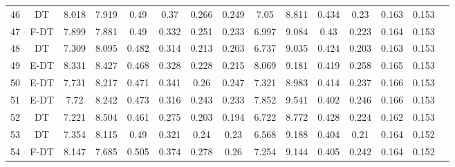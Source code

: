 \begin{longtable}{@{\hskip3pt}c@{\hskip3pt}c@{\hskip3pt}c@{\hskip3pt}c@{\hskip3pt}c@{\hskip3pt}c@{\hskip3pt}c@{\hskip3pt}c@{\hskip3pt}c@{\hskip3pt}c@{\hskip3pt}c@{\hskip3pt}c@{\hskip3pt}c@{\hskip3pt}c@{\hskip3pt}c}
         46 &             DT &             8.018 &          7.919 &            0.49 &            0.37 &           0.266 &           0.249 &                7.05 &           8.811 &           0.434 &          0.23 &          0.163 &           0.153 \\
         47 &           F-DT &             7.899 &          7.881 &            0.49 &           0.332 &           0.251 &           0.233 &               6.997 &           9.084 &            0.43 &         0.223 &          0.164 &           0.153 \\
         48 &             DT &             7.309 &          8.095 &           0.482 &           0.314 &           0.213 &           0.203 &               6.737 &           9.035 &           0.424 &         0.203 &          0.163 &           0.153 \\
         49 &           E-DT &             8.331 &          8.427 &           0.468 &           0.328 &           0.228 &           0.215 &               8.069 &           9.181 &           0.419 &         0.258 &          0.165 &           0.153 \\
         50 &           E-DT &             7.731 &          8.217 &           0.471 &           0.341 &            0.26 &           0.247 &               7.321 &           8.983 &           0.414 &         0.237 &          0.166 &           0.153 \\
         51 &           E-DT &              7.72 &          8.242 &           0.473 &           0.316 &           0.243 &           0.233 &               7.852 &           9.541 &           0.402 &         0.246 &          0.166 &           0.153 \\
         52 &             DT &             7.221 &          8.504 &           0.461 &           0.275 &           0.203 &           0.194 &               6.722 &           8.772 &           0.428 &         0.224 &          0.162 &           0.153 \\
         53 &             DT &             7.354 &          8.115 &            0.49 &           0.321 &            0.24 &            0.23 &               6.568 &           9.188 &           0.404 &          0.21 &          0.164 &           0.152 \\
         54 &           F-DT &             8.147 &          7.685 &           0.505 &           0.374 &           0.278 &            0.26 &               7.254 &           9.144 &           0.405 &         0.242 &          0.164 &           0.152 \\

\end{longtable}
